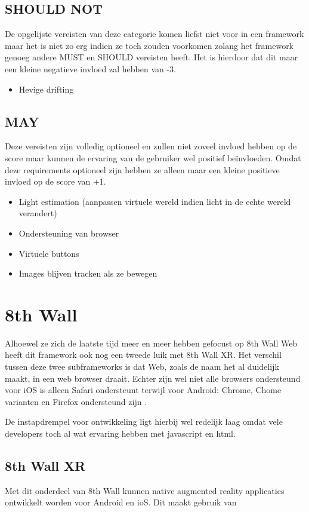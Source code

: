 \subsection{SHOULD NOT}
De opgelijste vereisten van deze categorie komen liefst niet voor in een framework maar het is niet zo erg indien ze toch zouden voorkomen zolang het framework genoeg andere MUST en SHOULD vereisten heeft. Het is hierdoor dat dit maar een kleine negatieve invloed zal hebben van -3.
\begin{itemize}
    \item Hevige drifting
\end{itemize} 

\subsection{MAY}
Deze vereisten zijn volledig optioneel en zullen niet zoveel invloed hebben op de score maar kunnen de ervaring van de gebruiker wel positief beïnvloeden. Omdat deze requirements optioneel zijn hebben ze alleen maar een kleine positieve invloed op de score van +1.
\begin{itemize}
    \item Light estimation (aanpassen virtuele wereld indien licht in de echte wereld verandert)
    \item Ondersteuning van browser
     \item Virtuele buttons
     \item Images blijven tracken als ze bewegen
\end{itemize} 

\section{8th Wall}
Alhoewel ze zich de laatste tijd meer en meer hebben gefocust op 8th Wall Web heeft dit framework ook nog een tweede luik met 8th Wall XR. Het verschil tussen deze twee subframeworks is dat Web, zoals de naam het al duidelijk maakt, in een web browser draait. Echter zijn wel niet alle browsers ondersteund voor iOS is alleen Safari ondersteunt terwijl voor Android: Chrome, Chome varianten en Firefox ondersteund zijn \autocite{8thWallWebReq}.

De instapdrempel voor ontwikkeling ligt hierbij wel redelijk laag omdat vele developers toch al wat ervaring hebben met javascript en html.

\subsection{8th Wall XR}
Met dit onderdeel van 8th Wall kunnen native augmented reality applicaties ontwikkelt worden voor Android en ioS. Dit maakt gebruik van



